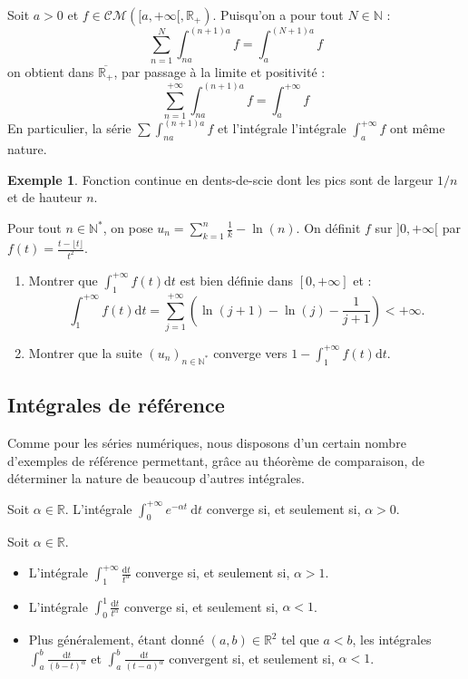 \documentclass[french]{article}
\newcommand{\N}{\mathbb{N}}
\newcommand{\R}{\mathbb{R}}
\newcommand{\st}{^*}
\renewcommand{\d}{\text{d}}
\theoremstyle{plain}
\theoremstyle{definition}
\newtheorem*{ex}{Exemple}
\theoremstyle{remark}
\begin{document}
\begin{met}
	Soit $a>0$ et $f\in\mathcal{CM}([a,+\infty[,\R_+)$. Puisqu'on a pour tout $N\in\N$ : $$\sum_{n=1}^{N}\int_{na}^{(n+1)a}f=\int_{a}^{(N+1)a}f$$ on obtient dans $\overline{\R_+}$, par passage à la limite et positivité : $$\sum_{n=1}^{+\infty}\int_{na}^{(n+1)a}f=\int_{a}^{+\infty}f$$ En particulier, la série $\displaystyle\sum \int_{na}^{(n+1)a}f$ et l'intégrale l'intégrale $\displaystyle\int_{a}^{+\infty} f$ ont même nature.
\end{met}

\begin{ex}
	Fonction continue en dents-de-scie dont les pics sont de largeur $1/n$ et de hauteur $n$.
\end{ex}

\begin{exo}
	Pour tout $n\in\N\st$, on pose $u_n=\displaystyle\sum_{k=1}^{n}\frac{1}{k}-\ln(n)$. On définit $f$ sur $]0,+\infty[$ par $f(t)=\displaystyle\frac{t-\lfloor t\rfloor}{t^2}$.
	\begin{enumerate}
		\item Montrer que $\displaystyle\int_{1}^{+\infty}f(t)\d t$ est bien définie dans $[0,+\infty]$ et : $$\int_{1}^{+\infty}f(t)\d t=\sum_{j=1}^{+\infty}\left(\ln(j+1)-\ln(j)-\frac{1}{j+1}\right)<+\infty.$$
		\item Montrer que la suite $(u_n)_{n\in\N\st}$ converge vers $1-\displaystyle\int_{1}^{+\infty}f(t)\d t$.
	\end{enumerate}
\end{exo}

\subsection{Intégrales de référence}

Comme pour les séries numériques, nous disposons d'un certain nombre d'exemples de référence permettant, grâce au théorème de comparaison, de déterminer la nature de beaucoup d'autres intégrales.

\begin{prop}%
	Soit $\alpha\in\R$. L'intégrale $\displaystyle\int_{0}^{+\infty}e^{-\alpha t}\ \d t$ converge si, et seulement si, $\alpha>0$.
\end{prop}

\begin{prop}%
	Soit $\alpha\in\R$.
	\begin{itemize}
		\item L'intégrale $\displaystyle\int_{1}^{+\infty}\frac{\d t}{t^\alpha}$ converge si, et seulement si, $\alpha>1$.
		\item L'intégrale $\displaystyle\int_{0}^{1}\frac{\d t}{t^\alpha}$ converge si, et seulement si, $\alpha<1$.
		\item Plus généralement, étant donné $(a,b)\in\R^2$ tel que $a<b$, les intégrales $\displaystyle\int_{a}^{b}\frac{\d t}{(b-t)^\alpha}$ et $\displaystyle\int_{a}^{b}\frac{\d t}{(t-a)^\alpha}$ convergent si, et seulement si, $\alpha<1$.
	\end{itemize}
\end{prop}
\end{document}
